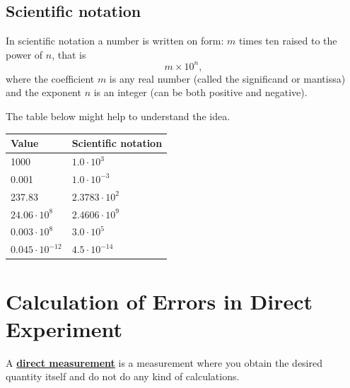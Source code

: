 \documentclass[12pt,a4paper]{article}
\newcommand{\definition}[1]{ \textcolor{MyRed}{\uline{\textbf {#1}}}}%
\begin{document}
\subsection{Scientific notation}
In scientific notation a number is written on form: $m$ times ten raised to the power of  $n$, that is
\begin{equation*}
m\times 10^n, 
\end{equation*}
where the coefficient $m$ is any real number (called the significand or mantissa) and the exponent $n$ is an integer (can be both positive and negative).

The table below might help to understand the idea.

\begin{center}
  \begin{tabular}{ | p{3cm} | p{4cm} |}
  \hline
    Value & Scientific notation\\ \hline  \hline
    \vspace{0.02cm} 1000 & \vspace{0.02 cm}$1.0\cdot10^3$ \\ \hline
    \vspace{0.02cm} 0.001 & \vspace{0.02cm} $1.0\cdot10^{-3}$ \\ \hline
    \vspace{0.02cm} 237.83 & \vspace{0.02cm} $2.3783\cdot10^{2}$ \\\hline
    \vspace{0.02cm} $24.06\cdot10^{8}$&\vspace{0.02cm}  $2.4606\cdot10^{9}$ \\ \hline
    \vspace{0.02cm} $0.003\cdot10^{8}$&\vspace{0.02cm}  $3.0\cdot10^{5}$ \\ \hline
    \vspace{0.02cm} $0.045\cdot10^{-12}$&\vspace{0.02cm}  $4.5\cdot10^{-14}$ \\ \hline
    
  \end{tabular}
\end{center}

\section{Calculation of Errors in Direct Experiment }
A \definition{direct measurement} is a measurement where you obtain the desired quantity itself and do not do any kind of calculations.
\end{document}
